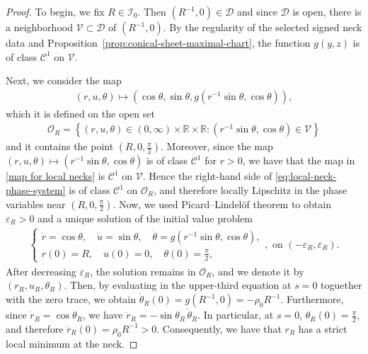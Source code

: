 \documentclass{amsart}
\theoremstyle{plain}
\theoremstyle{mainintrothm}
\theoremstyle{definition}
\begin{document}
\begin{proof}
	To begin, we fix $R\in\mathcal I_0$.  Then $(R^{-1},0)\in\mathcal D$ and since $\mathcal D$ is open,
	there is a neighborhood $\mathcal V\subset\mathcal D$ of $(R^{-1},0)$.  By
	the regularity of the selected signed neck data and
	Proposition~\ref{prop:conical-sheet-maximal-chart}, the function $g(y,z)$ is of
	class $\mathcal C^1$ on $\mathcal V$.
	
	\medskip
	
	Next, we consider the map 
	\begin{align}\label{map for local necks}
		(r,u,\theta)
		\mapsto
		\left(
		\cos\theta,
		\sin\theta,
		g\left(r^{-1}\sin\theta,\cos\theta\right)
		\right),
	\end{align}
which it is defined on the open set
	\begin{align*}
		\mathcal O_R
		=
		\left\{
		(r,u,\theta)\in(0,\infty)\times\mathbb R\times\mathbb R:
		\left(r^{-1}\sin\theta,\cos\theta\right)\in\mathcal V
		\right\}
	\end{align*}
	and it contains the point $\left(R,0,\frac{\pi}{2}\right)$. Moreover, since the map
	$(r,u,\theta)\mapsto\left(r^{-1}\sin\theta,\cos\theta\right)$ is of class $\mathcal C^1$ for $r>0$, we have that the map in \eqref{map for local necks} is $\mathcal C^1$ on
	$\mathcal V$.  Hence the right-hand side of  \eqref{eq:local-neck-phase-system} is of class $\mathcal C^1$ on
	$\mathcal O_R$, and therefore locally Lipschitz in the phase variables near
	$\left(R,0,\frac{\pi}{2}\right)$. Now, we used  Picard--Lindelöf theorem
	\cite[Theorem~2.2]{teschl2012ordinary} to obtain $\varepsilon_R>0$ and a
	unique solution of the initial value problem
	\begin{align*}
		\begin{cases}
			\dot r=\cos\theta,\quad 
			\dot u=\sin\theta,\quad\dot\theta=
			g\left(r^{-1}\sin\theta,\cos\theta\right),
			\\
			r(0)=R,\quad u(0)=0,\quad \theta(0)=\frac{\pi}{2},
		\end{cases}, \mbox{ on }(-\varepsilon_R,\varepsilon_R).
	\end{align*}
    After decreasing $\varepsilon_R$, the
	solution remains in $\mathcal O_R$, and we denote it by
	$(r_R,u_R,\theta_R)$. Then, by evaluating  in the upper-third equation at $s=0$ toguether with the zero trace, we obtain $\dot\theta_R(0)=g(R^{-1},0)=-\rho_0R^{-1}$. Furthermore, since $\dot r_R=\cos\theta_R$, we have $\ddot r_R=-\sin\theta_R\,\dot\theta_R$. In particular, at $s=0$, $\theta_R(0)=\frac{\pi}{2}$, and therefore $\ddot r_R(0)=\rho_0R^{-1}>0$.  Consequently, we have that $r_R$ has a strict local minimum at the neck.
	

\end{proof}
\end{document}
